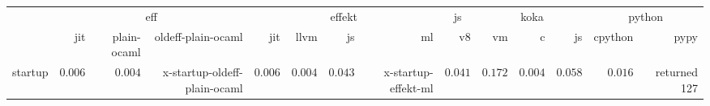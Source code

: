 \begin{tabular}{l r r r r r r r r r r r r r}
\toprule & \multicolumn{3}{c}{eff} & \multicolumn{4}{c}{effekt} & \multicolumn{1}{c}{js} & \multicolumn{3}{c}{koka} & \multicolumn{2}{c}{python} \\
\cmidrule(l){2-4}\cmidrule(l){5-8}\cmidrule(l){9-9}\cmidrule(l){10-12}\cmidrule(l){13-14} 
 & jit & plain-ocaml & oldeff-plain-ocaml & jit & llvm & js & ml & v8 & vm & c & js & cpython & pypy \\
\midrule
startup & $0.006$ & $0.004$ & x-startup-oldeff-plain-ocaml & $0.006$ & $0.004$ & $0.043$ & x-startup-effekt-ml & $0.041$ & $0.172$ & $\mathbf{0.004}$ & $0.058$ & $0.016$ & returned 127 \\
\bottomrule
\end{tabular}